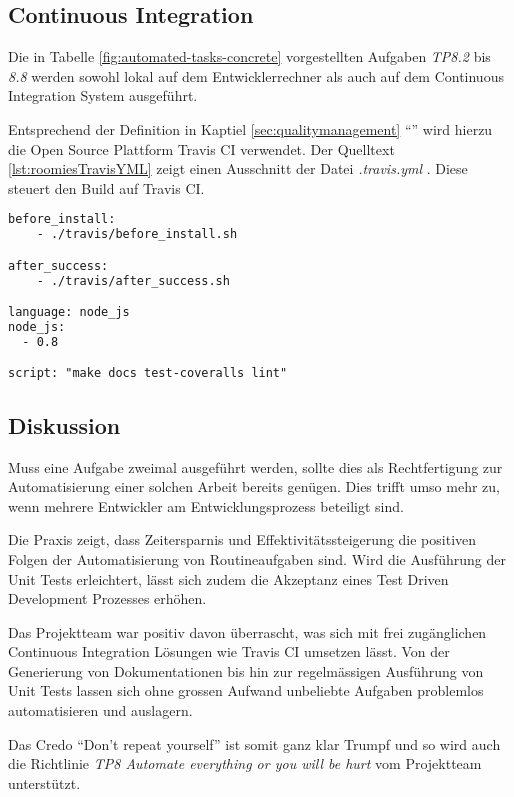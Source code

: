 \subsection*{Continuous Integration}

Die in Tabelle \ref{fig:automated-tasks-concrete} vorgestellten Aufgaben \emph{TP8.2} bis \emph{8.8} werden sowohl lokal auf dem Entwicklerrechner als auch auf dem Continuous Integration System ausgeführt.

Entsprechend der Definition in Kaptiel \ref{sec:qualitymanagement} ``'' wird hierzu die Open Source Plattform Travis CI \cite{TravisCI} verwendet. Der Quelltext \ref{lst:roomiesTravisYML} zeigt einen Ausschnitt der Datei \emph{.travis.yml} \cite{RoomiesTravisYML}. Diese steuert den Build auf Travis CI.

\begin{lstlisting}[language=XML, firstnumber=5, caption={Ausschnit aus .travis.yml \cite{RoomiesTravisYML}}, label=lst:roomiesTravisYML]
before_install:
    - ./travis/before_install.sh

after_success:
    - ./travis/after_success.sh

language: node_js
node_js:
  - 0.8

script: "make docs test-coveralls lint"
\end{lstlisting}

\subsection*{Diskussion}
Muss eine Aufgabe zweimal ausgeführt werden, sollte dies als Rechtfertigung zur Automatisierung einer solchen Arbeit bereits genügen. Dies trifft umso mehr zu, wenn mehrere Entwickler am Entwicklungsprozess beteiligt sind.

Die Praxis zeigt, dass Zeitersparnis und Effektivitätssteigerung die positiven Folgen der Automatisierung von Routineaufgaben sind. Wird die Ausführung der Unit Tests erleichtert, lässt sich zudem die Akzeptanz eines Test Driven Development Prozesses erhöhen.

Das Projektteam war positiv davon überrascht, was sich mit frei zugänglichen Continuous Integration Lösungen wie Travis CI \cite{TravisCI} umsetzen lässt. Von der Generierung von Dokumentationen bis hin zur regelmässigen Ausführung von Unit Tests lassen sich ohne grossen Aufwand unbeliebte Aufgaben problemlos automatisieren und auslagern.

Das Credo ``Don't repeat yourself'' ist somit ganz klar Trumpf und so wird auch die Richtlinie \emph{TP8 Automate everything or you will be hurt} vom Projektteam unterstützt.